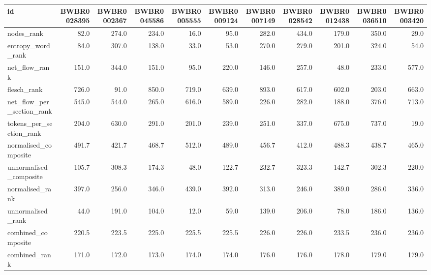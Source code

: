 \begin{tabular}{lrrrrrrrrrr}
\toprule
id & BWBR0028395 & BWBR0002367 & BWBR0045586 & BWBR0005555 & BWBR0009124 & BWBR0007149 & BWBR0028542 & BWBR0012438 & BWBR0036510 & BWBR0003420 \\
\midrule
nodes\_rank & 82.0 & 274.0 & 234.0 & 16.0 & 95.0 & 282.0 & 434.0 & 179.0 & 350.0 & 29.0 \\
\cline{1-11}
entropy\_word\_rank & 84.0 & 307.0 & 138.0 & 33.0 & 53.0 & 270.0 & 279.0 & 201.0 & 324.0 & 54.0 \\
\cline{1-11}
net\_flow\_rank & 151.0 & 344.0 & 151.0 & 95.0 & 220.0 & 146.0 & 257.0 & 48.0 & 233.0 & 577.0 \\
\cline{1-11}
flesch\_rank & 726.0 & 91.0 & 850.0 & 719.0 & 639.0 & 893.0 & 617.0 & 602.0 & 203.0 & 663.0 \\
\cline{1-11}
net\_flow\_per\_section\_rank & 545.0 & 544.0 & 265.0 & 616.0 & 589.0 & 226.0 & 282.0 & 188.0 & 376.0 & 713.0 \\
\cline{1-11}
tokens\_per\_section\_rank & 204.0 & 630.0 & 291.0 & 201.0 & 239.0 & 251.0 & 337.0 & 675.0 & 737.0 & 19.0 \\
\cline{1-11}
normalised\_composite & 491.7 & 421.7 & 468.7 & 512.0 & 489.0 & 456.7 & 412.0 & 488.3 & 438.7 & 465.0 \\
\cline{1-11}
unnormalised\_composite & 105.7 & 308.3 & 174.3 & 48.0 & 122.7 & 232.7 & 323.3 & 142.7 & 302.3 & 220.0 \\
\cline{1-11}
normalised\_rank & 397.0 & 256.0 & 346.0 & 439.0 & 392.0 & 313.0 & 246.0 & 389.0 & 286.0 & 336.0 \\
\cline{1-11}
unnormalised\_rank & 44.0 & 191.0 & 104.0 & 12.0 & 59.0 & 139.0 & 206.0 & 78.0 & 186.0 & 136.0 \\
\cline{1-11}
combined\_composite & 220.5 & 223.5 & 225.0 & 225.5 & 225.5 & 226.0 & 226.0 & 233.5 & 236.0 & 236.0 \\
\cline{1-11}
combined\_rank & 171.0 & 172.0 & 173.0 & 174.0 & 174.0 & 176.0 & 176.0 & 178.0 & 179.0 & 179.0 \\
\cline{1-11}
\bottomrule
\end{tabular}
